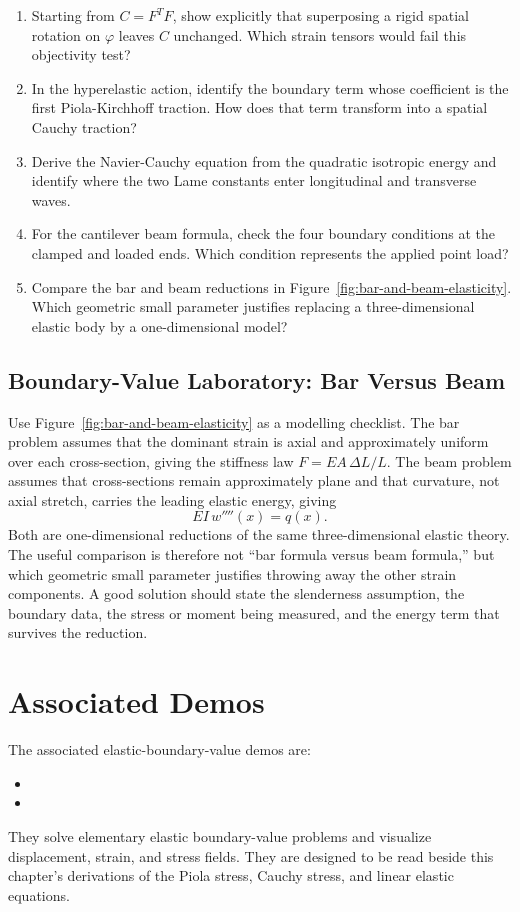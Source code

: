 \begin{enumerate}
\item Starting from \(C=F^TF\), show explicitly that superposing a rigid spatial
rotation on \(\varphi\) leaves \(C\) unchanged. Which strain tensors would fail
this objectivity test?
\item In the hyperelastic action, identify the boundary term whose coefficient
is the first Piola-Kirchhoff traction. How does that term transform into a
spatial Cauchy traction?
\item Derive the Navier-Cauchy equation from the quadratic isotropic energy and
identify where the two Lame constants enter longitudinal and transverse waves.
\item For the cantilever beam formula, check the four boundary conditions at the
clamped and loaded ends. Which condition represents the applied point load?
\item Compare the bar and beam reductions in Figure~\ref{fig:bar-and-beam-elasticity}.
Which geometric small parameter justifies replacing a three-dimensional elastic
body by a one-dimensional model?
\end{enumerate}

\subsection{Boundary-Value Laboratory: Bar Versus Beam}
\label{sec:elastic-bar-beam-lab}

Use Figure~\ref{fig:bar-and-beam-elasticity} as a modelling checklist. The bar
problem assumes that the dominant strain is axial and approximately uniform
over each cross-section, giving the stiffness law \(F=EA\,\Delta L/L\). The
beam problem assumes that cross-sections remain approximately plane and that
curvature, not axial stretch, carries the leading elastic energy, giving
\[
  EI\,w''''(x)=q(x).
\]
Both are one-dimensional reductions of the same three-dimensional elastic
theory. The useful comparison is therefore not ``bar formula versus beam
formula,'' but which geometric small parameter justifies throwing away the
other strain components. A good solution should state the slenderness
assumption, the boundary data, the stress or moment being measured, and the
energy term that survives the reduction.

\section{Associated Demos}
\label{sec:elastic-body-demos}

The associated elastic-boundary-value demos are:
\begin{itemize}
\item {}
\item {}
\end{itemize}
They solve elementary elastic boundary-value problems and visualize
displacement, strain, and stress fields. They are designed to be read beside
this chapter's derivations of the Piola stress, Cauchy stress, and linear
elastic equations.
